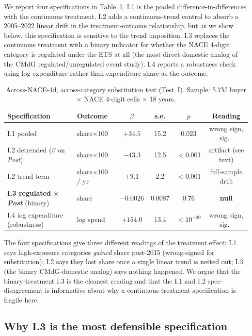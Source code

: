 We report four specifications in Table~\ref{tab:test_i_main}. I.1 is the pooled difference-in-differences with the continuous treatment. I.2 adds a continuous-trend control to absorb a 2005--2022 linear drift in the treatment-outcome relationship, but as we show below, this specification is sensitive to the trend imposition. I.3 replaces the continuous treatment with a binary indicator for whether the NACE 4-digit category is regulated under the ETS at all (the most direct domestic analog of the CMdG regulated/unregulated event study). I.4 reports a robustness check using log expenditure rather than expenditure share as the outcome.

\begin{table}[H]
    \centering
    \caption{Across-NACE-4d, across-category substitution test (Test~I). Sample: 5.7M buyer $\times$ NACE 4-digit cells $\times$ 18 years.}
    \label{tab:test_i_main}
    \begin{tabular}{llcccc}
        \toprule
        Specification & Outcome & $\beta$ & s.e. & $p$ & Reading \\
        \midrule
        I.1 pooled & share$\times$100 & $+34.5$ & 15.2 & 0.023 & wrong sign, sig.\ \\
        I.2 detrended ($\beta$ on \textit{Post})  & share$\times$100 & $-43.3$ & 12.5 & $<$0.001 & artifact (see text) \\
        I.2 trend term  & share$\times$100 / yr & $+9.1$ & 2.2 & $<$0.001 & full-sample drift \\
        \textbf{I.3 regulated $\times$ \textit{Post}} (binary) & share & $-0.0026$ & 0.0087 & 0.76 & \textbf{null} \\
        I.4 log expenditure (robustness) & log spend & $+154.0$ & 13.4 & $<10^{-30}$ & wrong sign, sig.\ \\
        \bottomrule
    \end{tabular}
\end{table}

The four specifications give three different readings of the treatment effect: I.1 says high-exposure categories \emph{gained} share post-2015 (wrong-signed for substitution); I.2 says they lost share once a single linear trend is netted out; I.3 (the binary CMdG-domestic analog) says nothing happened. We argue that the binary-treatment I.3 is the cleanest reading and that the I.1 and I.2 spec-disagreement is informative about why a continuous-treatment specification is fragile here.

\subsection{Why I.3 is the most defensible specification}

